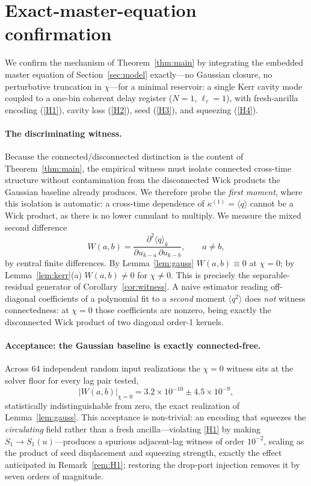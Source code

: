 \documentclass[11pt]{article}
\theoremstyle{remark}
\begin{document}
\section{Exact-master-equation confirmation}
\label{sec:empirical}

We confirm the mechanism of Theorem~\ref{thm:main} by integrating the embedded
master equation of Section~\ref{sec:model} exactly---no Gaussian closure, no
perturbative truncation in $\chi$---for a minimal reservoir: a single Kerr cavity
mode coupled to a one-bin coherent delay register ($N=1$, $\ell_\tau=1$), with
fresh-ancilla encoding (\ref{H1}), cavity loss (\ref{H2}), seed (\ref{H3}), and
squeezing (\ref{H4}).

\paragraph{The discriminating witness.}
Because the connected/disconnected distinction is the content of
Theorem~\ref{thm:main}, the empirical witness must isolate connected cross-time
structure without contamination from the disconnected Wick products the Gaussian
baseline already produces. We therefore probe the \emph{first moment}, where this
isolation is automatic: a cross-time dependence of $\kappa^{(1)}=\langle q\rangle$
cannot be a Wick product, as there is no lower cumulant to multiply. We measure
the mixed second difference
\begin{equation}
W(a,b)=\frac{\partial^2\langle q\rangle_k}{\partial u_{k-a}\,\partial u_{k-b}},
\qquad a\neq b,
\end{equation}
by central finite differences. By Lemma~\ref{lem:gauss} $W(a,b)\equiv0$ at
$\chi=0$; by Lemma~\ref{lem:kerr}(a) $W(a,b)\neq0$ for $\chi\neq0$. This is
precisely the separable-residual generator of Corollary~\ref{cor:witness}. A naive
estimator reading off-diagonal coefficients of a polynomial fit to a
\emph{second} moment $\langle q^2\rangle$ does \emph{not} witness connectedness:
at $\chi=0$ those coefficients are nonzero, being exactly the disconnected Wick
product of two diagonal order-1 kernels.

\paragraph{Acceptance: the Gaussian baseline is exactly connected-free.}
Across 64 independent random input realizations the $\chi=0$ witness sits at the
solver floor for every lag pair tested,
\[
|W(a,b)|_{\chi=0}=3.2\times10^{-10}\pm4.5\times10^{-9},
\]
statistically indistinguishable from zero, the exact realization of
Lemma~\ref{lem:gauss}. This acceptance is non-trivial: an encoding that squeezes
the \emph{circulating} field rather than a fresh ancilla---violating \ref{H1} by
making $S_1\to S_1(u)$---produces a spurious adjacent-lag witness of order
$10^{-2}$, scaling as the product of seed displacement and squeezing strength,
exactly the effect anticipated in Remark~\ref{rem:H1}; restoring the drop-port
injection removes it by seven orders of magnitude.
\end{document}
